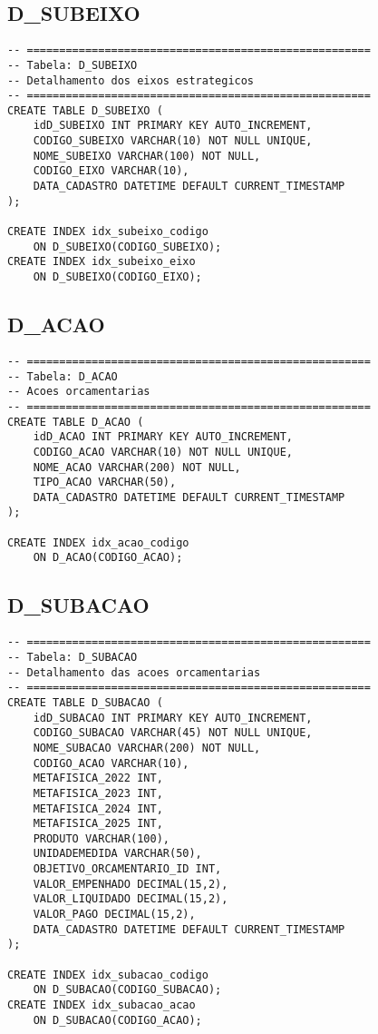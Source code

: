 \documentclass[12pt,a4paper]{article}
\begin{document}
\subsection{D\_SUBEIXO}

\begin{lstlisting}
-- =====================================================
-- Tabela: D_SUBEIXO
-- Detalhamento dos eixos estrategicos
-- =====================================================
CREATE TABLE D_SUBEIXO (
    idD_SUBEIXO INT PRIMARY KEY AUTO_INCREMENT,
    CODIGO_SUBEIXO VARCHAR(10) NOT NULL UNIQUE,
    NOME_SUBEIXO VARCHAR(100) NOT NULL,
    CODIGO_EIXO VARCHAR(10),
    DATA_CADASTRO DATETIME DEFAULT CURRENT_TIMESTAMP
);

CREATE INDEX idx_subeixo_codigo 
    ON D_SUBEIXO(CODIGO_SUBEIXO);
CREATE INDEX idx_subeixo_eixo 
    ON D_SUBEIXO(CODIGO_EIXO);
\end{lstlisting}

\subsection{D\_ACAO}

\begin{lstlisting}
-- =====================================================
-- Tabela: D_ACAO
-- Acoes orcamentarias
-- =====================================================
CREATE TABLE D_ACAO (
    idD_ACAO INT PRIMARY KEY AUTO_INCREMENT,
    CODIGO_ACAO VARCHAR(10) NOT NULL UNIQUE,
    NOME_ACAO VARCHAR(200) NOT NULL,
    TIPO_ACAO VARCHAR(50),
    DATA_CADASTRO DATETIME DEFAULT CURRENT_TIMESTAMP
);

CREATE INDEX idx_acao_codigo 
    ON D_ACAO(CODIGO_ACAO);
\end{lstlisting}

\subsection{D\_SUBACAO}

\begin{lstlisting}
-- =====================================================
-- Tabela: D_SUBACAO
-- Detalhamento das acoes orcamentarias
-- =====================================================
CREATE TABLE D_SUBACAO (
    idD_SUBACAO INT PRIMARY KEY AUTO_INCREMENT,
    CODIGO_SUBACAO VARCHAR(45) NOT NULL UNIQUE,
    NOME_SUBACAO VARCHAR(200) NOT NULL,
    CODIGO_ACAO VARCHAR(10),
    METAFISICA_2022 INT,
    METAFISICA_2023 INT,
    METAFISICA_2024 INT,
    METAFISICA_2025 INT,
    PRODUTO VARCHAR(100),
    UNIDADEMEDIDA VARCHAR(50),
    OBJETIVO_ORCAMENTARIO_ID INT,
    VALOR_EMPENHADO DECIMAL(15,2),
    VALOR_LIQUIDADO DECIMAL(15,2),
    VALOR_PAGO DECIMAL(15,2),
    DATA_CADASTRO DATETIME DEFAULT CURRENT_TIMESTAMP
);

CREATE INDEX idx_subacao_codigo 
    ON D_SUBACAO(CODIGO_SUBACAO);
CREATE INDEX idx_subacao_acao 
    ON D_SUBACAO(CODIGO_ACAO);
\end{lstlisting}
\end{document}
